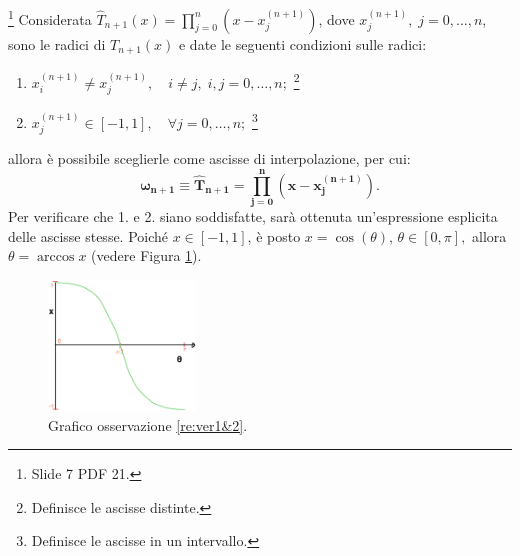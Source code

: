 \begin{remark}\label{re:ver1&2}\footnote{Slide 7 PDF 21.}
    Considerata $\widehat T_{n+1}(x)=\prod_{j=0}^n\left(x-x_j^{(n+1)}\right)$, dove $x_j^{(n+1)},\; j=0,\hdots,n$, sono le radici di $T_{n+1}(x)$ e date le seguenti condizioni sulle radici:
    \begin{enumerate}
        \item $x_i^{(n+1)}\neq x_j^{(n+1)},\quad i\neq j,\; i,j=0,\hdots,n;$ \footnote{Definisce le ascisse distinte.}
        \item $x_j^{(n+1)}\in [-1,1],\quad \forall j=0,\hdots,n;$ \footnote{Definisce le ascisse in un intervallo.}
    \end{enumerate}
    allora è possibile sceglierle come ascisse di interpolazione, per cui:
    \begin{equation*}
        \boldsymbol{\omega_{n+1}\equiv\widehat T_{n+1}=\prod_{j=0}^{n}\left(x-x_j^{(n+1)}\right)}.
    \end{equation*}
    Per verificare che 1. e 2. siano soddisfatte, sarà ottenuta un'espressione esplicita delle ascisse stesse. Poiché $x\in [-1,1]$, è posto $x=\cos(\theta),\, \theta\in [0,\pi],$ allora $\theta=\arccos{x}$ (vedere Figura \ref{fig:cosThetaChebyshev}).
\end{remark}

\begin{figure}
    \centering
    \includegraphics[width=0.35\textwidth]{immagini/cosThetaChebyshev.png}
    \caption{Grafico osservazione \ref{re:ver1&2}.}\label{fig:cosThetaChebyshev}
\end{figure}

